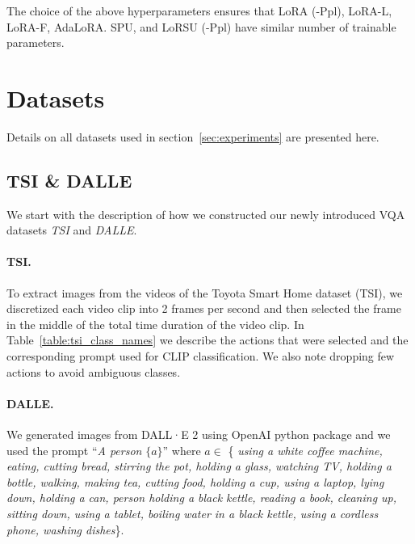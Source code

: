 The choice of the above hyperparameters ensures that LoRA (-Ppl), LoRA-L, LoRA-F, AdaLoRA. SPU, and LoRSU (-Ppl) have similar number of trainable parameters. 

\section{Datasets}\label{sec_appx:datasets}
Details on all datasets used in section~\ref{sec:experiments} are presented here. 

\subsection{TSI \& DALLE}
We start with the description of how we constructed our newly introduced VQA datasets \emph{TSI} and \emph{DALLE}.

\paragraph{TSI.}  To extract  images from the videos of the Toyota Smart Home dataset (TSI), we discretized each video clip into 2 frames per second and then selected the frame in the middle of the total time duration of the video clip. In Table~\ref{table:tsi_class_names} we describe the actions that were selected and the corresponding prompt used for CLIP classification. We also note dropping few actions to avoid ambiguous classes.


\paragraph{DALLE.} We generated images from DALL·E 2 using OpenAI python package and we used the prompt
 ``\textit{A person} $\{a\}$'' where $a \in $ \{ \textit{using a white coffee machine, 
                 eating, 
                 cutting bread, 
                 stirring the pot, 
                 holding a glass, 
                 watching TV, 
                 holding a bottle, 
                 walking, 
                 making tea, 
                 cutting food, 
                 holding a cup, 
                 using a laptop, 
                 lying down, 
                 holding a can, 
                 person holding a black kettle, 
                 reading a book, 
                 cleaning up, 
                 sitting down, 
                 using a tablet, 
                 boiling water in a black kettle, 
                 using a cordless phone, 
                 washing dishes}\}.

